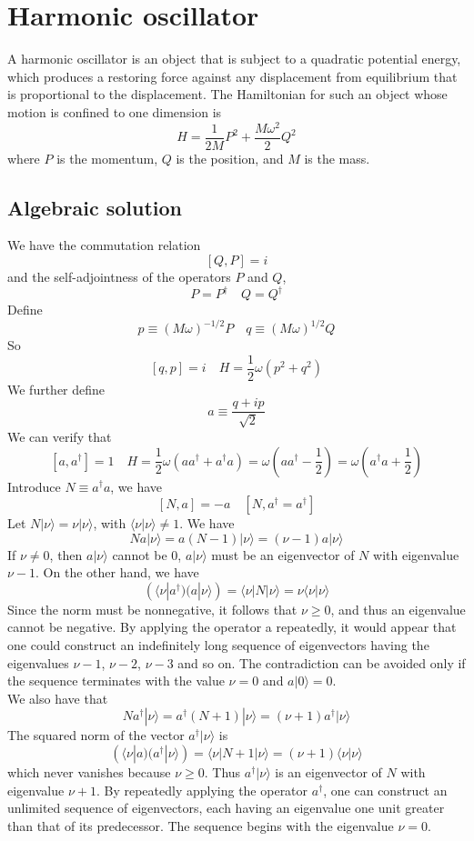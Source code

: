 \documentclass[cyan]{elegantnote}
\begin{document}
\section{Harmonic oscillator}
A harmonic oscillator is an object that is subject to a quadratic potential energy, which produces a restoring force against any displacement from equilibrium that is proportional to the displacement. The Hamiltonian for such an object whose motion is confined to one dimension is
\[H = \frac{1}{2M}P^2 + \frac{M\omega^2}{2}Q^2\]
where $P$ is the momentum, $Q$ is the position, and $M$ is the mass.
\subsection{Algebraic solution}
We have the commutation relation
\[[Q,P] = i\]
and the self-adjointness of the operators $P$ and $Q$,
\[P = P^{\dagger} \quad Q = Q^{\dagger}\]
Define
\[ p \equiv (M\omega)^{-1/2}P \quad q \equiv (M\omega)^{1/2}Q\]
So
\[[q,p] = i \quad H = \frac{1}{2}\omega(p^2+q^2)\]
We further define
\[a \equiv \frac{q+ip}{\sqrt{2}}\]
We can verify that
\[[a,a^{\dagger}] = 1 \quad H = \frac{1}{2}\omega(aa^{\dagger}+a^{\dagger}a) = \omega(aa^{\dagger}-\frac{1}{2}) = \omega(a^{\dagger}a+\frac{1}{2})\]
Introduce $N \equiv a^{\dagger}a$, we have
\[[N,a] = -a \quad [N,a^{\dagger} = a^{\dagger}]\]
Let $N|\nu\rangle = \nu|\nu\rangle $, with $\langle \nu | \nu \rangle \neq 1$. We have
\[Na|\nu\rangle = a(N-1)|\nu\rangle = (\nu-1)a|\nu\rangle\]
If $\nu \neq 0$, then $a|\nu\rangle$ cannot be $0$, $a|\nu\rangle$ must be an eigenvector of $N$ with eigenvalue $\nu - 1$.
On the other hand, we have
\[(\langle \nu | a^{\dagger})(a|\nu\rangle) = \langle \nu | N | \nu \rangle = \nu \langle \nu | \nu \rangle\]
Since the norm must be nonnegative, it follows that $\nu \geq 0$, and thus an eigenvalue cannot be negative. By applying the operator a repeatedly, it would appear that one could construct an indefinitely long sequence of eigenvectors
having the eigenvalues $\nu-1$, $\nu-2$, $\nu-3$ and so on.
The contradiction can be avoided only if the sequence terminates with the value $\nu=0$ and $a|0\rangle = 0$.\\
We also have that
\[Na^{\dagger}|\nu\rangle = a^{\dagger}(N+1)|\nu\rangle = (\nu+1)a^{\dagger}|\nu\rangle\]
The squared norm of the vector $a^{\dagger} |\nu\rangle$ is
\[(\langle \nu | a)(a^{\dagger} | \nu \rangle)= \langle \nu | N+1|\nu\rangle = (\nu+1) \langle \nu | \nu \rangle \]
which never vanishes because $\nu \geq 0$. Thus $a^{\dagger} | \nu \rangle$ is an eigenvector of $N$ with eigenvalue $\nu+1$. By repeatedly applying the operator $a^{\dagger}$, one can construct an unlimited sequence of eigenvectors, each having an eigenvalue one unit greater than that of its predecessor. The sequence begins with the eigenvalue $\nu=0$.
\end{document}
